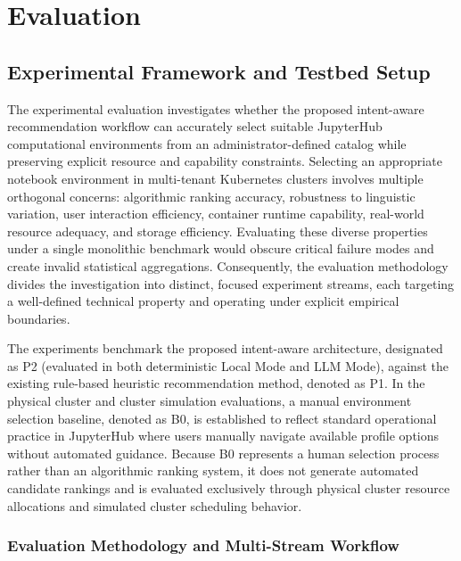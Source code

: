\chapter{Evaluation}
\label{chap:experiments_and_evaluation}

\section{Experimental Framework and Testbed Setup}
\label{sec:experimental_design}

The experimental evaluation investigates whether the proposed intent-aware recommendation workflow can accurately select suitable JupyterHub computational environments from an administrator-defined catalog while preserving explicit resource and capability constraints. Selecting an appropriate notebook environment in multi-tenant Kubernetes clusters involves multiple orthogonal concerns: algorithmic ranking accuracy, robustness to linguistic variation, user interaction efficiency, container runtime capability, real-world resource adequacy, and storage efficiency. Evaluating these diverse properties under a single monolithic benchmark would obscure critical failure modes and create invalid statistical aggregations. Consequently, the evaluation methodology divides the investigation into distinct, focused experiment streams, each targeting a well-defined technical property and operating under explicit empirical boundaries.

The experiments benchmark the proposed intent-aware architecture, designated as P2 (evaluated in both deterministic Local Mode and LLM Mode), against the existing rule-based heuristic recommendation method, denoted as P1. In the physical cluster and cluster simulation evaluations, a manual environment selection baseline, denoted as B0, is established to reflect standard operational practice in JupyterHub where users manually navigate available profile options without automated guidance. Because B0 represents a human selection process rather than an algorithmic ranking system, it does not generate automated candidate rankings and is evaluated exclusively through physical cluster resource allocations and simulated cluster scheduling behavior.

\subsection{Evaluation Methodology and Multi-Stream Workflow}
\label{subsec:experiment_streams}

